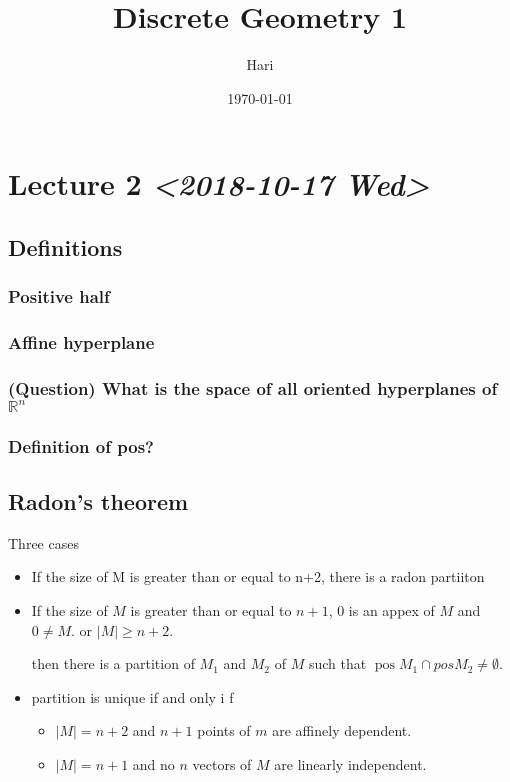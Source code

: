 \documentclass[11pt]{article}
\author{Hari}
\date{\today}
\title{Discrete Geometry 1}
\def\R{\mathbb{R}}
\def\pos{\operatorname{pos}}
\begin{document}
\maketitle
\tableofcontents

\section{Lecture 2 \textit{<2018-10-17 Wed>}}
\label{sec:org99ff25c}

\subsection{Definitions}
\label{sec:orgfc4880c}
\subsubsection{Positive half}
\label{sec:orgfcdb5d5}
\subsubsection{Affine hyperplane}
\label{sec:org0cb87c3}
\subsubsection{(Question) What is the space of all oriented hyperplanes of \(\R^n\)}
\label{sec:org07a5358}
\subsubsection{Definition of pos?}
\label{sec:orga11df03}
\subsection{Radon's theorem}
\label{sec:orga54465d}
Three cases

\begin{itemize}
\item If the size of M is greater than or equal to n+2, there is a radon partiiton
\item If the size of \(M\) is greater than or equal to \(n+1\), \(0\) is an appex of
\(M\) and \(0\neq M\). or \(|M| \ge n+2\).

then there is a partition of \(M_1\) and \(M_2\) of \(M\) such that \(\pos M_1
     \cap pos M_2 \neq \emptyset\).
\item partition is unique if and only i f
\begin{itemize}
\item \(|M| = n+2\) and \(n+1\) points of \(m\) are affinely dependent.
\item \(|M| = n+1\) and no \(n\) vectors of \(M\) are linearly independent.
\end{itemize}
\end{itemize}
\end{document}
